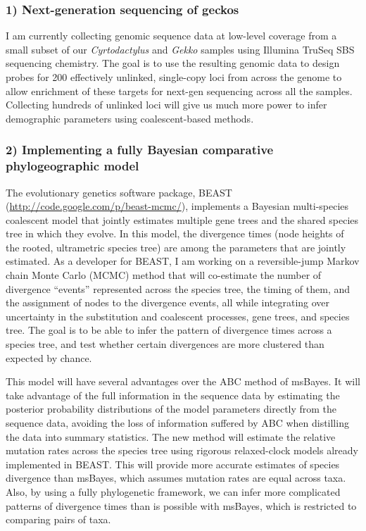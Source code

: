 \documentclass[10pt]{article}
\begin{document}
\subsubsection*{1) Next-generation sequencing of geckos}
I am currently collecting genomic sequence data at low-level coverage from a
small subset of our \emph{Cyrtodactylus} and \emph{Gekko} samples using
Illumina TruSeq SBS sequencing chemistry.
The goal is to use the resulting genomic data to design probes for 200
effectively unlinked, single-copy loci from across the genome to allow
enrichment of these targets for next-gen sequencing across all the samples.
Collecting hundreds of unlinked loci will give us much more power to infer
demographic parameters using coalescent-based methods.

\subsubsection*{2) Implementing a fully Bayesian comparative phylogeographic
model}
The evolutionary genetics software package, BEAST
(\url{http://code.google.com/p/beast-mcmc/}), implements a Bayesian
multi-species coalescent model that jointly estimates multiple gene trees and
the shared species tree in which they evolve.
In this model, the divergence times (node heights of the rooted, ultrametric
species tree) are among the parameters that are jointly estimated.
As a developer for BEAST, I am working on a reversible-jump Markov chain Monte
Carlo (MCMC) method that will co-estimate the number of divergence ``events''
represented across the species tree, the timing of them, and the assignment of
nodes to the divergence events, all while integrating over uncertainty in the
substitution and coalescent processes, gene trees, and species tree.
The goal is to be able to infer the pattern of divergence times across a
species tree, and test whether certain divergences are more clustered than
expected by chance.

This model will have several advantages over the ABC method of msBayes.
It will take advantage of the full information in the sequence data by
estimating the posterior probability distributions of the model parameters
directly from the sequence data, avoiding the loss of information suffered by
ABC when distilling the data into summary statistics.
The new method will estimate the relative mutation rates across the species
tree using rigorous relaxed-clock models already implemented in BEAST.
This will provide more accurate estimates of species divergence than msBayes,
which assumes mutation rates are equal across taxa.
Also, by using a fully phylogenetic framework, we can infer more complicated
patterns of divergence times than is possible with msBayes, which is restricted
to comparing pairs of taxa.
\end{document}
